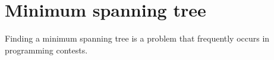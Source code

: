 \section{Minimum spanning tree}
Finding a minimum spanning tree is a problem that frequently occurs in programming contests.



